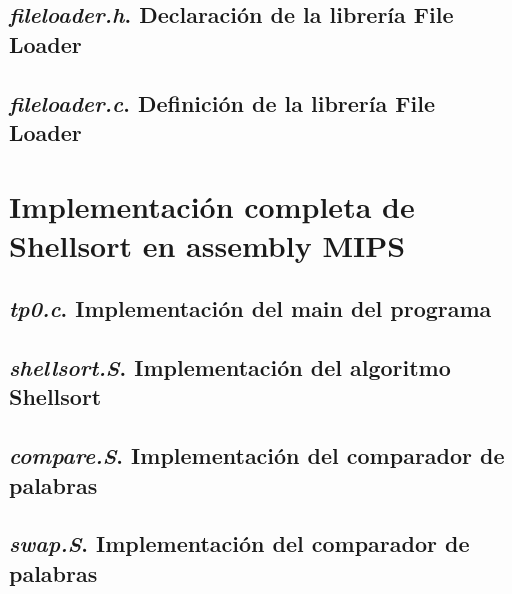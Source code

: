 \documentclass{article}
\begin{document}
\begin{appendices}
\subsection{\textit{fileloader.h}. Declaración de la librería File Loader}
%  

\subsection{\textit{fileloader.c}. Definición de la librería File Loader}
%  




\section{Implementación completa de Shellsort en assembly MIPS}


\subsection{\textit{tp0.c}. Implementación del main del programa}
%  
\bigskip\bigskip

\subsection{\textit{shellsort.S}. Implementación del algoritmo Shellsort}
%  
\bigskip\bigskip

\subsection{\textit{compare.S}. Implementación del comparador de palabras}
%  
\bigskip\bigskip

\subsection{\textit{swap.S}. Implementación del comparador de palabras}
%  
\bigskip\bigskip


\end{appendices}
\end{document}
